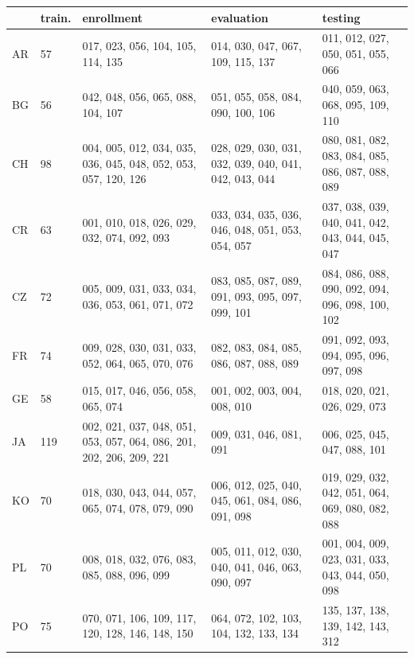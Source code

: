 \documentclass[bsc,frontabs,twoside,singlespacing,parskip,deptreport]{infthesis}
\begin{document}
{{    \begin{sc}
      \centering
      \footnotesize
      \begin{longtable}{p{0.5cm}|p{0.8cm}|p{3.9cm}|p{3.5cm}|p{3.5cm}}
        & train. & enrollment & evaluation & testing \\
        \hline
        AR & 57 & 017, 023, 056, 104, 105, 114, 135 & 014, 030, 047, 067, 109, 115, 137 & 011, 012, 027, 050, 051, 055, 066 \\
        \hline
        BG & 56 & 042, 048, 056, 065, 088, 104, 107 & 051, 055, 058, 084, 090, 100, 106 & 040, 059, 063, 068, 095, 109, 110 \\
        \hline
        CH & 98 & 004, 005, 012, 034, 035, 036, 045, 048, 052, 053, 057, 120, 126 & 028, 029, 030, 031, 032, 039, 040, 041, 042, 043, 044 & 080, 081, 082, 083, 084, 085, 086, 087, 088, 089 \\
        \hline
        CR & 63 & 001, 010, 018, 026, 029, 032, 074, 092, 093 & 033, 034, 035, 036, 046, 048, 051, 053, 054, 057 & 037, 038, 039, 040, 041, 042, 043, 044, 045, 047 \\
        \hline
        CZ & 72 & 005, 009, 031, 033, 034, 036, 053, 061, 071, 072 & 083, 085, 087, 089, 091, 093, 095, 097, 099, 101 & 084, 086, 088, 090, 092, 094, 096, 098, 100, 102 \\
        \hline
        FR & 74 & 009, 028, 030, 031, 033, 052, 064, 065, 070, 076 & 082, 083, 084, 085, 086, 087, 088, 089 & 091, 092, 093, 094, 095, 096, 097, 098 \\
        \hline
        GE & 58 & 015, 017, 046, 056, 058, 065, 074 & 001, 002, 003, 004, 008, 010 & 018, 020, 021, 026, 029, 073 \\
        \hline
        JA & 119 & 002, 021, 037, 048, 051, 053, 057, 064, 086, 201, 202, 206, 209, 221 & 009, 031, 046, 081, 091 & 006, 025, 045, 047, 088, 101 \\
        \hline
        KO & 70 & 018, 030, 043, 044, 057, 065, 074, 078, 079, 090 & 006, 012, 025, 040, 045, 061, 084, 086, 091, 098 & 019, 029, 032, 042, 051, 064, 069, 080, 082, 088 \\
        \hline
        PL & 70 & 008, 018, 032, 076, 083, 085, 088, 096, 099 & 005, 011, 012, 030, 040, 041, 046, 063, 090, 097 & 001, 004, 009, 023, 031, 033, 043, 044, 050, 098 \\
        \hline
        PO & 75 & 070, 071, 106, 109, 117, 120, 128, 146, 148, 150 & 064, 072, 102, 103, 104, 132, 133, 134 & 135, 137, 138, 139, 142, 143, 312 \\
        \hline

\end{longtable}
\end{sc}}}
\end{document}
